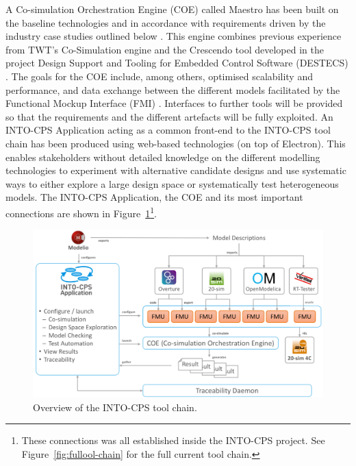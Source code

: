 A Co-simulation Orchestration Engine (COE) called Maestro has been built on the baseline technologies and in accordance with requirements driven by the industry case studies outlined below \cite{Thule&17}. This engine combines previous experience from TWT's Co-Simulation engine and the Crescendo tool developed in the project Design Support and Tooling for Embedded Control Software (DESTECS) \cite{Broenink&10}. The goals for the COE include, among others, optimised scalability and performance, and data exchange between the different models facilitated by the Functional Mockup Interface (FMI) \cite{FMIStandard2.0}. Interfaces to further tools will be provided so that the requirements and the different artefacts will be fully exploited. An INTO-CPS Application acting as a common front-end to the INTO-CPS tool chain has been produced using web-based technologies (on top of Electron). This enables stakeholders without detailed knowledge on the different modelling technologies to experiment with alternative candidate designs and use systematic ways to either explore a large design space or systematically test heterogeneous models. The INTO-CPS Application, the COE and its most important connections are shown in Figure~\ref{fig:toolchain}\footnote{These connections was all established inside the INTO-CPS project. See Figure~\ref{fig:fullool-chain} for the full current tool chain. }.

\begin{figure}[ht]
\centering
\includegraphics[width=\textwidth]{./figures/toolchain}
\caption{Overview of the INTO-CPS tool chain.}
\label{fig:toolchain}
\end{figure}

